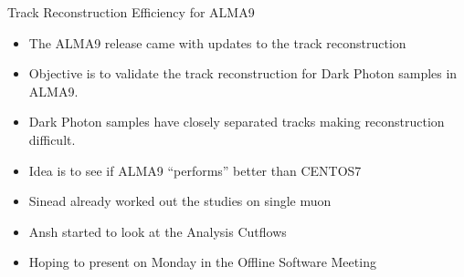 \begin{frame}{Track Reconstruction Efficiency for ALMA9}
    \begin{itemize}
        \small
        \item The ALMA9 release came with updates to the track reconstruction
        \item Objective is to validate the track reconstruction for Dark Photon samples in ALMA9.
        \item Dark Photon samples have closely separated tracks making reconstruction difficult.
        \item Idea is to see if ALMA9 ``performs'' better than CENTOS7 
        \item Sinead already worked out the studies on single muon 
        \item Ansh started to look at the Analysis Cutflows
        \item Hoping to present on Monday in the Offline Software Meeting
    \end{itemize}
\end{frame}


